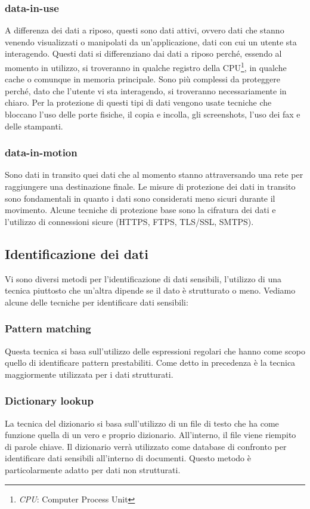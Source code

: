     \subsubsection{data-in-use}
        A differenza dei dati a riposo, questi sono dati attivi, ovvero dati che stanno venendo
        visualizzati o manipolati da un'applicazione, dati con cui un utente sta interagendo. 
        Questi dati si differenziano dai dati a riposo perché, essendo al momento in utilizzo, 
        si troveranno in qualche registro della CPU\footnote{\textit{CPU}: Computer Process Unit}, in qualche cache 
        o comunque in memoria principale. Sono più complessi da proteggere perché, dato che l'utente vi sta
        interagendo, si troveranno necessariamente in chiaro. Per la protezione di questi tipi di dati
        vengono usate tecniche che bloccano l'uso delle porte fisiche, il copia e incolla, gli screenshots, l'uso dei fax
        e delle stampanti.

    \subsubsection{data-in-motion}
        Sono dati in transito quei dati che al momento stanno attraversando una rete per raggiungere 
        una destinazione finale. Le misure di protezione dei dati in transito sono fondamentali in quanto
        i dati sono considerati meno sicuri durante il movimento.
        Alcune tecniche di protezione base sono la cifratura dei dati
        e l'utilizzo di connessioni sicure (HTTPS, FTPS, TLS/SSL, SMTPS).

\subsection{Identificazione dei dati}
    Vi sono diversi metodi per l'identificazione di dati sensibili, l'utilizzo di una tecnica piuttosto che
    un'altra dipende se il dato è strutturato o meno. Vediamo alcune delle tecniche per identificare
    dati sensibili: \cite{DLP4}
    \subsubsection{Pattern matching}
    Questa tecnica si basa sull'utilizzo delle espressioni regolari che hanno come scopo quello
    di identificare pattern prestabiliti. Come detto in precedenza è la tecnica maggiormente 
    utilizzata per i dati strutturati. 

    \subsubsection{Dictionary lookup}
    La tecnica del dizionario si basa sull'utilizzo di un file di testo che ha come funzione quella
    di un vero e proprio dizionario. All'interno, il file viene riempito di parole chiave. 
    Il dizionario verrà utilizzato come database di confronto per identificare dati sensibili all'interno 
    di documenti. Questo metodo è particolarmente adatto per dati non strutturati.

